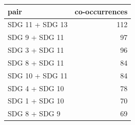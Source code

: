 \begin{tabular}{lr}
\toprule
pair & co-occurrences \\
\midrule
SDG 11 + SDG 13 & 112 \\
SDG 9 + SDG 11 & 97 \\
SDG 3 + SDG 11 & 96 \\
SDG 8 + SDG 11 & 84 \\
SDG 10 + SDG 11 & 84 \\
SDG 4 + SDG 10 & 78 \\
SDG 1 + SDG 10 & 70 \\
SDG 8 + SDG 9 & 69 \\
\bottomrule
\end{tabular}
